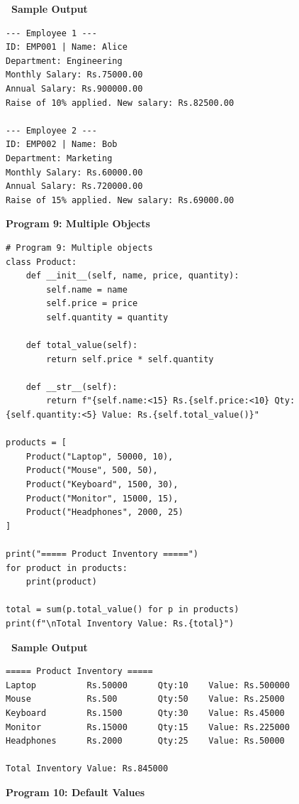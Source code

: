 \documentclass[12pt,a4paper]{article}
\newcommand{\outhead}{\noindent\colorbox{cmrgreen!25}%
  {\textbf{\small\color{cmrdark}~Sample Output~}}\par\vspace{-1pt}}
\begin{document}
\outhead
\begin{lstlisting}[style=outputstyle]
--- Employee 1 ---
ID: EMP001 | Name: Alice
Department: Engineering
Monthly Salary: Rs.75000.00
Annual Salary: Rs.900000.00
Raise of 10% applied. New salary: Rs.82500.00

--- Employee 2 ---
ID: EMP002 | Name: Bob
Department: Marketing
Monthly Salary: Rs.60000.00
Annual Salary: Rs.720000.00
Raise of 15% applied. New salary: Rs.69000.00
\end{lstlisting}

\vspace{0.5cm}

\textbf{Program 9: Multiple Objects}

\begin{lstlisting}
# Program 9: Multiple objects
class Product:
    def __init__(self, name, price, quantity):
        self.name = name
        self.price = price
        self.quantity = quantity

    def total_value(self):
        return self.price * self.quantity

    def __str__(self):
        return f"{self.name:<15} Rs.{self.price:<10} Qty:{self.quantity:<5} Value: Rs.{self.total_value()}"

products = [
    Product("Laptop", 50000, 10),
    Product("Mouse", 500, 50),
    Product("Keyboard", 1500, 30),
    Product("Monitor", 15000, 15),
    Product("Headphones", 2000, 25)
]

print("===== Product Inventory =====")
for product in products:
    print(product)

total = sum(p.total_value() for p in products)
print(f"\nTotal Inventory Value: Rs.{total}")
\end{lstlisting}

\outhead
\begin{lstlisting}[style=outputstyle]
===== Product Inventory =====
Laptop          Rs.50000      Qty:10    Value: Rs.500000
Mouse           Rs.500        Qty:50    Value: Rs.25000
Keyboard        Rs.1500       Qty:30    Value: Rs.45000
Monitor         Rs.15000      Qty:15    Value: Rs.225000
Headphones      Rs.2000       Qty:25    Value: Rs.50000

Total Inventory Value: Rs.845000
\end{lstlisting}

\vspace{0.5cm}

\textbf{Program 10: Default Values}
\end{document}
